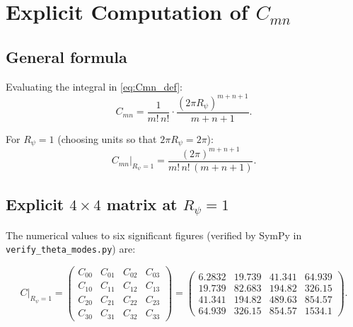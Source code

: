 \documentclass[12pt,a4paper]{article}
\theoremstyle{remark}
\begin{document}
\section{Explicit Computation of $C_{mn}$}
\label{sec:Cmn}

\subsection{General formula}

Evaluating the integral in \eqref{eq:Cmn_def}:
\begin{equation}
  \label{eq:Cmn_formula}
  C_{mn}
  = \frac{1}{m!\,n!}
    \cdot \frac{(2\pi R_\psi)^{m+n+1}}{m+n+1}.
\end{equation}

For $R_\psi = 1$ (choosing units so that $2\pi R_\psi = 2\pi$):
\begin{equation}
  C_{mn}\big|_{R_\psi=1}
  = \frac{(2\pi)^{m+n+1}}{m!\,n!\,(m+n+1)}.
\end{equation}

\subsection{Explicit $4\times 4$ matrix at $R_\psi=1$}

The numerical values to six significant figures (verified by SymPy in
\texttt{verify\_theta\_modes.py}) are:

\begin{equation}
  \label{eq:Cmn_matrix}
  C\big|_{R_\psi=1}
  =
  \begin{pmatrix}
    C_{00} & C_{01} & C_{02} & C_{03} \\
    C_{10} & C_{11} & C_{12} & C_{13} \\
    C_{20} & C_{21} & C_{22} & C_{23} \\
    C_{30} & C_{31} & C_{32} & C_{33}
  \end{pmatrix}
  =
  \begin{pmatrix}
    6.2832 & 19.739 & 41.341 & 64.939 \\
    19.739 & 82.683 & 194.82 & 326.15 \\
    41.341 & 194.82 & 489.63 & 854.57 \\
    64.939 & 326.15 & 854.57 & 1534.1
  \end{pmatrix}.
\end{equation}
\end{document}
